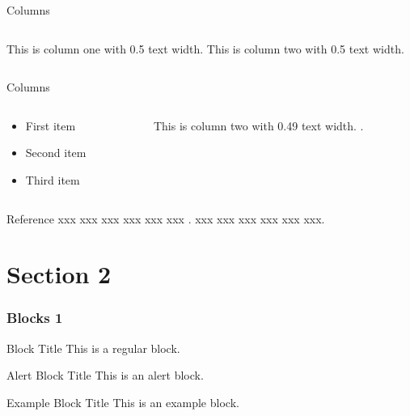 \documentclass[compress,aspectratio=43]{beamer}
\begin{document}
\begin{frame}{Columns}
    \begin{columns}
        This is column one with 0.5 text width.
        This is column two with 0.5 text width.
    \end{columns}
\end{frame}


\begin{frame}{Columns}

    \begin{columns}
        \begin{column}{0.49\textwidth}
            \begin{itemize}
                \item First item
                \item Second item
                \item Third item
            \end{itemize}
        \end{column}
        \hfill
        \begin{column}{0.49\textwidth}
            This is column two with 0.49 text width.
            \textcite{kochDynamicalLowRank2007}.
        \end{column}

    \end{columns}

\end{frame}

\begin{frame}{Reference}
    xxx xxx xxx xxx xxx xxx .
    xxx xxx xxx xxx xxx xxx.
\end{frame}

\section{Section 2}

\begin{frame}
    \frametitle{Blocks 1}
    \begin{block}{Block Title}
        This is a regular block.
    \end{block}

    \begin{alertblock}{Alert Block Title}
        This is an alert block.
    \end{alertblock}

    \begin{exampleblock}{Example Block Title}
        This is an example block.
    \end{exampleblock}
\end{frame}
\end{document}
